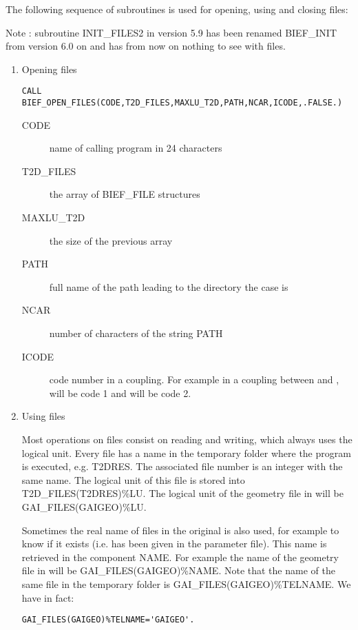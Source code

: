 The following sequence of subroutines is used for opening, using and closing
files:

Note : subroutine INIT\_FILES2 in \bief version 5.9 has been renamed BIEF\_INIT
from version 6.0 on and has from now on nothing to see with files.
\begin{enumerate}
  \item{Opening files}

\begin{lstlisting}[language=TelFortran]
CALL BIEF_OPEN_FILES(CODE,T2D_FILES,MAXLU_T2D,PATH,NCAR,ICODE,.FALSE.)
\end{lstlisting}
\begin{description}
  \item [CODE] name of calling program in 24 characters
  \item [T2D\_FILES] the array of BIEF\_FILE structures
  \item [MAXLU\_T2D] the size of the previous array
  \item [PATH] full name of the path leading to the directory the case is
  \item [NCAR] number of characters of the string PATH
  \item [ICODE] code number in a coupling. For example in a coupling between
 and \tomawac,  will be code 1 and \tomawac will be
code 2.
\end{description}
\item Using files

Most operations on files consist on reading and writing, which always uses the
logical unit. Every file has a name in the temporary folder where the program
is executed, e.g. T2DRES. The associated file number is an integer with the
same name. The logical unit of this file is stored into T2D\_FILES(T2DRES)\%LU.
The logical unit of the geometry file in \gaia will be GAI\_FILES(GAIGEO)\%LU.

Sometimes the real name of files in the original is also used, for example to
know if it exists (i.e. has been given in the parameter file). This name is
retrieved in the component NAME. For example the name of the geometry file in
\gaia will be GAI\_FILES(GAIGEO)\%NAME. Note that the name of the same file
in the temporary folder is GAI\_FILES(GAIGEO)\%TELNAME. We have in fact:

\begin{lstlisting}[language=TelFortran]
GAI_FILES(GAIGEO)%TELNAME='GAIGEO'.
\end{lstlisting}


\end{enumerate}

